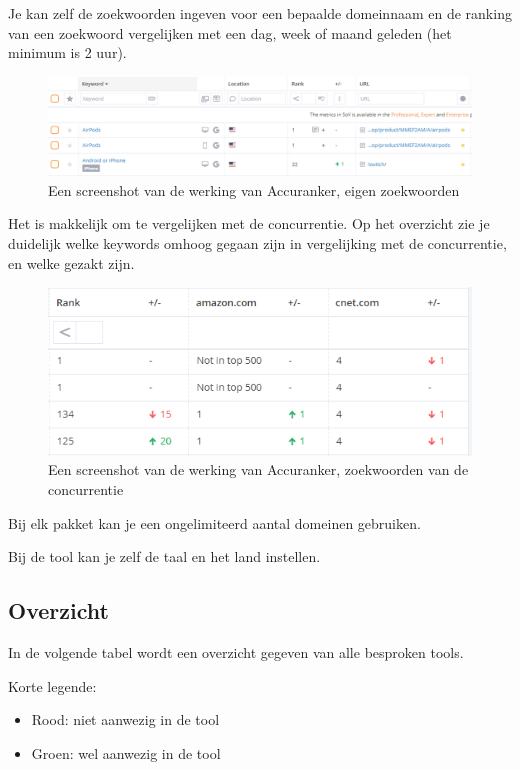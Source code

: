 Je kan zelf de zoekwoorden ingeven voor een bepaalde domeinnaam en de ranking van een zoekwoord vergelijken met een dag, week of maand geleden (het minimum is 2 uur). 

\begin{figure}[h!]
\centering
\includegraphics[width=\linewidth]{img/accuranker.PNG}
\caption{Een screenshot van de werking van Accuranker, eigen zoekwoorden
\autocite{accuranker}}
\end{figure}

Het is makkelijk om te vergelijken met de concurrentie. Op het overzicht zie je duidelijk welke keywords omhoog gegaan zijn in vergelijking met de concurrentie, en welke gezakt zijn. 

\begin{figure}[h!]
\centering
\includegraphics[width=\linewidth]{img/accurankercompetitie.PNG}
\caption{Een screenshot van de werking van Accuranker, zoekwoorden van de concurrentie
\autocite{accuranker}}
\end{figure}

Bij elk pakket kan je een ongelimiteerd aantal domeinen gebruiken. 

Bij de tool kan je zelf de taal en het land instellen. 

\subsection{Overzicht}
\label{ch: Overzicht}

In de volgende tabel wordt een overzicht gegeven van alle besproken tools. 

Korte legende: 
\begin{itemize}
\item Rood: niet aanwezig in de tool
\item Groen: wel aanwezig in de tool
\end{itemize}

